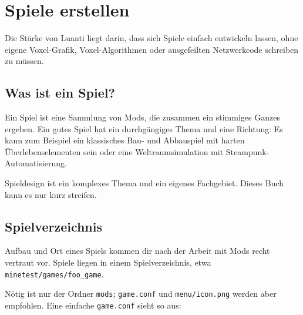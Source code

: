\chapter{Spiele erstellen}
\label{ch:games/games}

Die Stärke von Luanti liegt darin, dass sich Spiele einfach entwickeln
lassen, ohne eigene Voxel-Grafik, Voxel-Algorithmen oder ausgefeilten
Netzwerkcode schreiben zu müssen.

\section{Was ist ein Spiel?}\label{was-ist-ein-spiel}

Ein Spiel ist eine Sammlung von Mods, die zusammen ein stimmiges Ganzes
ergeben. Ein gutes Spiel hat ein durchgängiges Thema und eine Richtung:
Es kann zum Beispiel ein klassisches Bau- und Abbauspiel mit harten
Überlebenselementen sein oder eine Weltraumsimulation mit
Steampunk-Automatisierung.

Spieldesign ist ein komplexes Thema und ein eigenes Fachgebiet. Dieses
Buch kann es nur kurz streifen.

\section{Spielverzeichnis}\label{spielverzeichnis}

Aufbau und Ort eines Spiels kommen dir nach der Arbeit mit Mods recht
vertraut vor. Spiele liegen in einem Spielverzeichnis, etwa
\texttt{minetest/\allowbreak{}games/\allowbreak{}foo\_\allowbreak{}game}.

\begin{Shaded}
\begin{Highlighting}[]
\end{Highlighting}
\end{Shaded}

Nötig ist nur der Ordner \texttt{mods};
\texttt{game.\allowbreak{}conf}
und \texttt{menu/\allowbreak{}icon.\allowbreak{}png} werden aber
empfohlen. Eine einfache \texttt{game.\allowbreak{}conf} sieht so aus:

\begin{Shaded}
\begin{Highlighting}[]
\end{Highlighting}
\end{Shaded}

